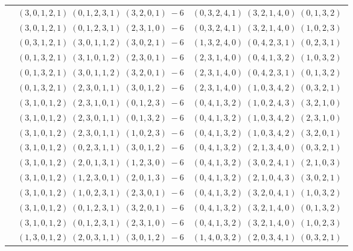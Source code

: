 \documentclass[11pt]{article}
\begin{document}
\begin{longtable}[l]{|c|c|c|}
 \cline{2-3} 
 & $(3 ,0 ,1 ,2 ,1) \;(0 ,1 ,2 ,3 ,1) \;(3 ,2 ,0 ,1) \;-6$ & $(0 ,3 ,2 ,4 ,1) \;(3 ,2 ,1 ,4 ,0) \;(0 ,1 ,3 ,2) \;$\\ 
 \cline{2-3} 
 & $(3 ,0 ,1 ,2 ,1) \;(0 ,1 ,2 ,3 ,1) \;(2 ,3 ,1 ,0) \;-6$ & $(0 ,3 ,2 ,4 ,1) \;(3 ,2 ,1 ,4 ,0) \;(1 ,0 ,2 ,3) \;$\\ 
 \cline{2-3} 
 & $(0 ,3 ,1 ,2 ,1) \;(3 ,0 ,1 ,1 ,2) \;(3 ,0 ,2 ,1) \;-6$ & $(1 ,3 ,2 ,4 ,0) \;(0 ,4 ,2 ,3 ,1) \;(0 ,2 ,3 ,1) \;$\\ 
 \cline{2-3} 
 & $(0 ,1 ,3 ,2 ,1) \;(3 ,1 ,0 ,1 ,2) \;(2 ,3 ,0 ,1) \;-6$ & $(2 ,3 ,1 ,4 ,0) \;(0 ,4 ,1 ,3 ,2) \;(1 ,0 ,3 ,2) \;$\\ 
 \cline{2-3} 
 & $(0 ,1 ,3 ,2 ,1) \;(3 ,0 ,1 ,1 ,2) \;(3 ,2 ,0 ,1) \;-6$ & $(2 ,3 ,1 ,4 ,0) \;(0 ,4 ,2 ,3 ,1) \;(0 ,1 ,3 ,2) \;$\\ 
 \cline{2-3} 
 & $(0 ,1 ,3 ,2 ,1) \;(2 ,3 ,0 ,1 ,1) \;(3 ,0 ,1 ,2) \;-6$ & $(2 ,3 ,1 ,4 ,0) \;(1 ,0 ,3 ,4 ,2) \;(0 ,3 ,2 ,1) \;$\\ 
 \cline{2-3} 
 & $(3 ,1 ,0 ,1 ,2) \;(2 ,3 ,1 ,0 ,1) \;(0 ,1 ,2 ,3) \;-6$ & $(0 ,4 ,1 ,3 ,2) \;(1 ,0 ,2 ,4 ,3) \;(3 ,2 ,1 ,0) \;$\\ 
 \cline{2-3} 
 & $(3 ,1 ,0 ,1 ,2) \;(2 ,3 ,0 ,1 ,1) \;(0 ,1 ,3 ,2) \;-6$ & $(0 ,4 ,1 ,3 ,2) \;(1 ,0 ,3 ,4 ,2) \;(2 ,3 ,1 ,0) \;$\\ 
 \cline{2-3} 
 & $(3 ,1 ,0 ,1 ,2) \;(2 ,3 ,0 ,1 ,1) \;(1 ,0 ,2 ,3) \;-6$ & $(0 ,4 ,1 ,3 ,2) \;(1 ,0 ,3 ,4 ,2) \;(3 ,2 ,0 ,1) \;$\\ 
 \cline{2-3} 
 & $(3 ,1 ,0 ,1 ,2) \;(0 ,2 ,3 ,1 ,1) \;(3 ,0 ,1 ,2) \;-6$ & $(0 ,4 ,1 ,3 ,2) \;(2 ,1 ,3 ,4 ,0) \;(0 ,3 ,2 ,1) \;$\\ 
 \cline{2-3} 
 & $(3 ,1 ,0 ,1 ,2) \;(2 ,0 ,1 ,3 ,1) \;(1 ,2 ,3 ,0) \;-6$ & $(0 ,4 ,1 ,3 ,2) \;(3 ,0 ,2 ,4 ,1) \;(2 ,1 ,0 ,3) \;$\\ 
 \cline{2-3} 
 & $(3 ,1 ,0 ,1 ,2) \;(1 ,2 ,3 ,0 ,1) \;(2 ,0 ,1 ,3) \;-6$ & $(0 ,4 ,1 ,3 ,2) \;(2 ,1 ,0 ,4 ,3) \;(3 ,0 ,2 ,1) \;$\\ 
 \cline{2-3} 
 & $(3 ,1 ,0 ,1 ,2) \;(1 ,0 ,2 ,3 ,1) \;(2 ,3 ,0 ,1) \;-6$ & $(0 ,4 ,1 ,3 ,2) \;(3 ,2 ,0 ,4 ,1) \;(1 ,0 ,3 ,2) \;$\\ 
 \cline{2-3} 
 & $(3 ,1 ,0 ,1 ,2) \;(0 ,1 ,2 ,3 ,1) \;(3 ,2 ,0 ,1) \;-6$ & $(0 ,4 ,1 ,3 ,2) \;(3 ,2 ,1 ,4 ,0) \;(0 ,1 ,3 ,2) \;$\\ 
 \cline{2-3} 
 & $(3 ,1 ,0 ,1 ,2) \;(0 ,1 ,2 ,3 ,1) \;(2 ,3 ,1 ,0) \;-6$ & $(0 ,4 ,1 ,3 ,2) \;(3 ,2 ,1 ,4 ,0) \;(1 ,0 ,2 ,3) \;$\\ 
 \cline{2-3} 
 & $(1 ,3 ,0 ,1 ,2) \;(2 ,0 ,3 ,1 ,1) \;(3 ,0 ,1 ,2) \;-6$ & $(1 ,4 ,0 ,3 ,2) \;(2 ,0 ,3 ,4 ,1) \;(0 ,3 ,2 ,1) \;$\\ 

\end{longtable}
\end{document}
